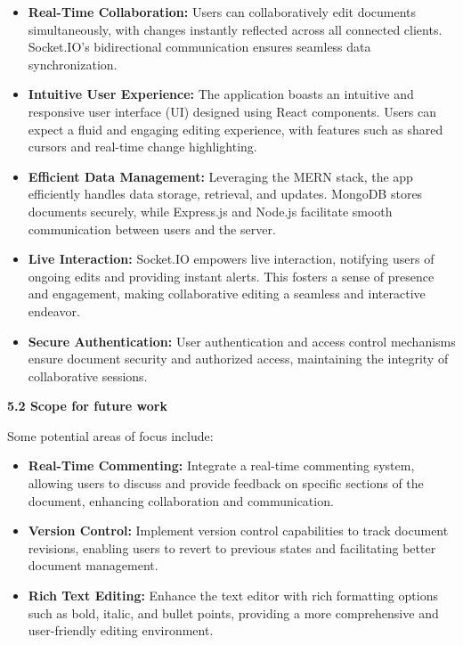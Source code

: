 \documentclass{article}
\begin{document}
\begin{itemize}
    \item {\bfseries Real-Time Collaboration: } Users can collaboratively edit documents simultaneously, with changes instantly reflected across all connected clients. Socket.IO's bidirectional communication ensures seamless data synchronization.

    \item {\bfseries Intuitive User Experience:  } The application boasts an intuitive and responsive user interface (UI) designed using React components. Users can expect a fluid and engaging editing experience, with features such as shared cursors and real-time change highlighting.

    \item {\bfseries Efficient Data Management:  } Leveraging the MERN stack, the app efficiently handles data storage, retrieval, and updates. MongoDB stores documents securely, while Express.js and Node.js facilitate smooth communication between users and the server.

    \item {\bfseries Live Interaction:  } Socket.IO empowers live interaction, notifying users of ongoing edits and providing instant alerts. This fosters a sense of presence and engagement, making collaborative editing a seamless and interactive endeavor.

    \item {\bfseries Secure Authentication:  } User authentication and access control mechanisms ensure document security and authorized access, maintaining the integrity of collaborative sessions.
\end{itemize}

\vspace{25pt}

{\Large\bfseries 5.2 Scope for future work \\}

{\normalsize  Some potential areas of focus include: \\}

\begin{itemize}
        \item {\bfseries Real-Time Commenting: } Integrate a real-time commenting system, allowing users to discuss and provide feedback on specific sections of the document, enhancing collaboration and communication.

    \item {\bfseries Version Control:  } Implement version control capabilities to track document revisions, enabling users to revert to previous states and facilitating better document management.
    
    \item {\bfseries Rich Text Editing:  } Enhance the text editor with rich formatting options such as bold, italic, and bullet points, providing a more comprehensive and user-friendly editing environment.  
\end{itemize}
    
\end{document}
